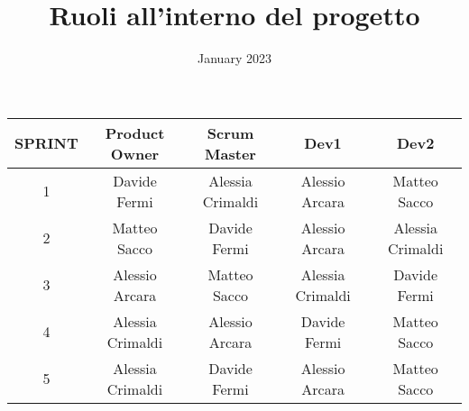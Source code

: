 \documentclass{article}
\title{Ruoli all'interno del progetto}
\date{January 2023}
\begin{document}
    \maketitle

    \begin{center}
        \begin{tabular}{ |c|c|c|c|c| }
            \hline
            SPRINT & Product Owner    & Scrum Master     & Dev1             & Dev2             \\
            \hline
            1      & Davide Fermi     & Alessia Crimaldi & Alessio Arcara   & Matteo Sacco     \\
            \hline
            2      & Matteo Sacco     & Davide Fermi     & Alessio Arcara   & Alessia Crimaldi \\
            \hline
            3      & Alessio Arcara   & Matteo Sacco     & Alessia Crimaldi & Davide Fermi     \\
            \hline
            4      & Alessia Crimaldi & Alessio Arcara   & Davide Fermi     & Matteo Sacco   \\
            \hline
            5      & Alessia Crimaldi & Davide Fermi     & Alessio Arcara   & Matteo Sacco     \\
            \hline
        \end{tabular}
    \end{center}
\end{document}
